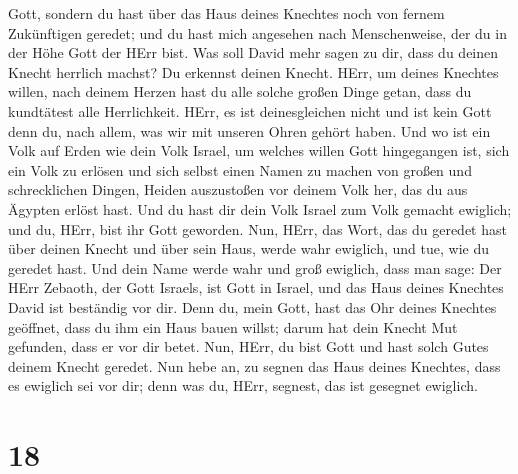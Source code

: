 Gott, sondern du hast über das Haus deines Knechtes noch von fernem
Zukünftigen geredet; und du hast mich angesehen nach Menschenweise, der
du in der Höhe Gott der HErr bist.  Was soll David mehr
sagen zu dir, dass du deinen Knecht herrlich machst? Du erkennst deinen
Knecht.  HErr, um deines Knechtes willen, nach deinem
Herzen hast du alle solche großen Dinge getan, dass du kundtätest alle
Herrlichkeit.  HErr, es ist deinesgleichen nicht und ist
kein Gott denn du, nach allem, was wir mit unseren Ohren gehört haben.
 Und wo ist ein Volk auf Erden wie dein Volk Israel, um
welches willen Gott hingegangen ist, sich ein Volk zu erlösen und sich
selbst einen Namen zu machen von großen und schrecklichen Dingen, Heiden
auszustoßen vor deinem Volk her, das du aus Ägypten erlöst hast.
 Und du hast dir dein Volk Israel zum Volk gemacht
ewiglich; und du, HErr, bist ihr Gott geworden.  Nun,
HErr, das Wort, das du geredet hast über deinen Knecht und über sein
Haus, werde wahr ewiglich, und tue, wie du geredet hast. 
Und dein Name werde wahr und groß ewiglich, dass man sage: Der HErr
Zebaoth, der Gott Israels, ist Gott in Israel, und das Haus deines
Knechtes David ist beständig vor dir.  Denn du, mein
Gott, hast das Ohr deines Knechtes geöffnet, dass du ihm ein Haus bauen
willst; darum hat dein Knecht Mut gefunden, dass er vor dir betet.
 Nun, HErr, du bist Gott und hast solch Gutes deinem
Knecht geredet.  Nun hebe an, zu segnen das Haus deines
Knechtes, dass es ewiglich sei vor dir; denn was du, HErr, segnest, das
ist gesegnet ewiglich.

\hypertarget{section-17}{%
\section{18}\label{section-17}}

